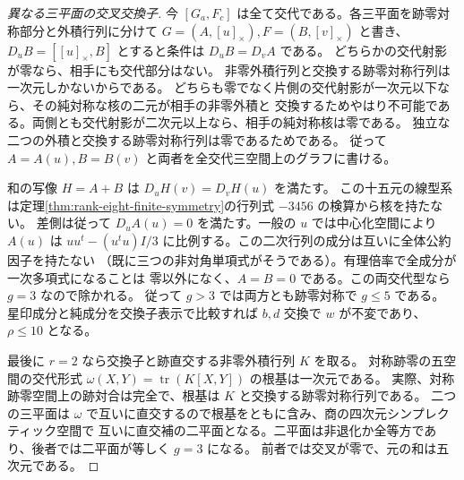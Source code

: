 \begin{proof}[異なる三平面の交叉交換子]
今 $[G_a,F_c]$ は全て交代である。各三平面を跡零対称部分と外積行列に分けて
$G=(A,[u]_\times), F=(B,[v]_\times)$ と書き、
$D_u B=[[u]_\times,B]$ とすると条件は $D_u B=D_v A$ である。
どちらかの交代射影が零なら、相手にも交代部分はない。
非零外積行列と交換する跡零対称行列は一次元しかないからである。
どちらも零でなく片側の交代射影が一次元以下なら、その純対称な核の二元が相手の非零外積と
交換するためやはり不可能である。両側とも交代射影が二次元以上なら、相手の純対称核は零である。
独立な二つの外積と交換する跡零対称行列は零であるためである。
従って $A=A(u), B=B(v)$ と両者を全交代三空間上のグラフに書ける。

和の写像 $H=A+B$ は $D_u H(v)=D_v H(u)$ を満たす。
この十五元の線型系は定理\ref{thm:rank-eight-finite-symmetry}の行列式 $-3456$ の検算から核を持たない。
差側は従って $D_u A(u)=0$ を満たす。一般の $u$ では中心化空間により
$A(u)$ は $u u^t-(u^tu)I/3$ に比例する。この二次行列の成分は互いに全体公約因子を持たない
（既に三つの非対角単項式がそうである）。有理倍率で全成分が一次多項式になることは
零以外になく、$A=B=0$ である。この両交代型なら $g=3$ なので除かれる。
従って $g>3$ では両方とも跡零対称で $g\le5$ である。
星印成分と純成分を交換子表示で比較すれば $b,d$ 交換で $w$ が不変であり、$\rho\le10$ となる。

最後に $r=2$ なら交換子と跡直交する非零外積行列 $K$ を取る。
対称跡零の五空間の交代形式 $\omega(X,Y)=\operatorname{tr}(K[X,Y])$ の根基は一次元である。
実際、対称跡零空間上の跡対合は完全で、根基は $K$ と交換する跡零対称行列である。
二つの三平面は $\omega$ で互いに直交するので根基をともに含み、商の四次元シンプレクティック空間で
互いに直交補の二平面となる。二平面は非退化か全等方であり、後者では二平面が等しく $g=3$ になる。
前者では交叉が零で、元の和は五次元である。
\end{proof}
